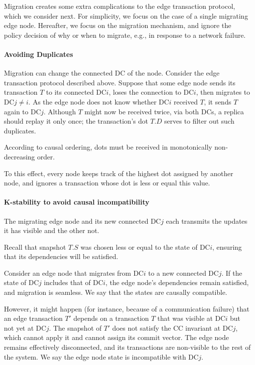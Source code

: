 Migration creates some extra complications to the edge transaction
protocol, which we consider next.
For simplicity, we focus on the case of a single migrating edge node.
Hereafter, we focus on the migration mechanism, and ignore the policy
decision of why or when to migrate, e.g., in response to a network failure.

\paragraph{Avoiding Duplicates}

Migration can change the connected DC of the node.
Consider the edge transaction protocol described above.
Suppose that some edge node sends its transaction $T$ to its connected
DC$i$, loses the connection to DC$i$, then migrates to DC$j \neq i$.
As the edge node does not know whether DC$i$ received $T$, it
sends $T$ again to DC$j$.
Although $T$ might now be received twice, via both DCs, a replica should
replay it only once; the transaction's dot $T.D$ serves to filter out
such duplicates.

According to causal ordering, dots must be received in monotonically
non-decreasing order.

To this effect, every node keeps track of the highest dot assigned by
another node, and ignores a transaction whose dot is less or equal this
value.

\paragraph{K-stability to avoid causal incompatibility}

The migrating edge node and its new connected DC$j$ each transmits the
updates it has visible and the other not.

Recall that snapshot $T.S$ was chosen less or equal to the state of
DC$i$, ensuring that its dependencies will be satisfied.

Consider an edge node that migrates from DC$i$ to a new connected DC$j$.
If the state of DC$j$ includes that of DC$i$, the edge node's
dependencies remain satisfied, and migration is seamless.
We say that the states are causally compatible.

However, it might happen (for instance, because of a communication
failure) that an edge transaction $T'$ depends on a transaction $T$ that was
visible at DC$i$ but not yet at DC$j$.
The snapshot of $T'$ does not satisfy the CC invariant at DC$j$, which
cannot apply it and cannot assign its commit vector.
The edge node remains effectively disconnected, and its 
transactions are non-visible to the rest of the system.
We say the edge node state is incompatible with DC$j$.


